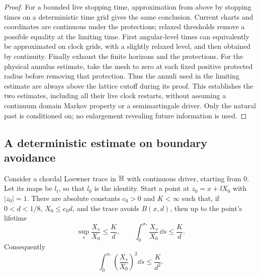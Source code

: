 \begin{proof}
For a bounded live stopping time, approximation from above by stopping
times on a deterministic time grid gives the same conclusion.  Current
charts and coordinates are continuous under the protections; relaxed
thresholds remove a possible equality at the limiting time.  First
angular-level times can equivalently be approximated on clock grids,
with a slightly relaxed level, and then obtained by continuity.
Finally exhaust the finite horizons and the protections.  For the
physical annulus estimate, take the mesh to zero at each fixed positive
protected radius before removing that protection.  Thus the annuli used
in the limiting estimate are always above the lattice cutoff during its
proof.  This establishes the two estimates, including all their live
clock restarts, without assuming a continuum domain Markov property or
a semimartingale driver.  Only the natural past is conditioned on; no
enlargement revealing future information is used.
\end{proof}

\subsection{A deterministic estimate on boundary avoidance}

\begin{lemma}\label{eng:reflection}
Consider a chordal Loewner trace in $\mathbb H$ with continuous driver, starting
from $0$.  Let its maps be $l_t$, so that $l_0$ is the identity.  Start a
point at $z_0=x+\ii X_0$ with $|z_0|=1$.  There are absolute constants
$c_0>0$ and $K<\infty$ such that, if $0<d<1/8$, $X_0\le c_0d$, and the trace avoids
$B(x,d)$, then up to the point's lifetime
\begin{equation}\label{eng:avoidance-deterministic}
 \sup_s\frac{X_s}{X_0}\le\frac Kd,
 \qquad
 \int_0^{\sigma_*}\frac{X_s}{X_0}\,\dd s\le\frac Kd.
\end{equation}
Consequently
\begin{equation}\label{eng:avoidance-square}
 \int_0^{\sigma_*}\left(\frac{X_s}{X_0}\right)^2\dd s
 \le\frac K{d^2}.
\end{equation}
\end{lemma}

